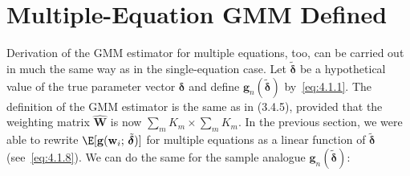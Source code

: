 
\section{Multiple-Equation GMM Defined}
\label{sec:4.2}

Derivation of the GMM estimator for multiple equations, too, can be carried out in
much the same way as in the single-equation case. Let $\tilde{\boldsymbol{\delta}}$
be a hypothetical value of the true parameter vector $\boldsymbol{\delta}$ and define
$\mathbf{g}_n(\tilde{\boldsymbol{\delta}})$ by~\eqref{eq:4.1.1}. The definition of the GMM
estimator is the same as in (3.4.5), provided that the weighting matrix
$\hat{\mathbf{W}}$ is now
$\sum_m K_m \times \sum_m K_m$. In the previous section, we were able to rewrite
$\E[\mathbf{g}(\mathbf{w}_i;\, \tilde{\boldsymbol{\delta}})]$ for multiple equations as a
linear function of $\tilde{\boldsymbol{\delta}}$ (see~\eqref{eq:4.1.8}).
We can do the same for the sample analogue
$\mathbf{g}_n(\tilde{\boldsymbol{\delta}})$:
